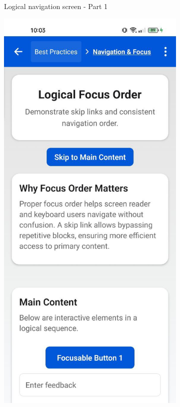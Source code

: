 \begin{enumerate}
\begin{itemize}
\begin{figure}[ht]
\begin{subfigure}[b]{0.48\textwidth}
                \caption{Logical navigation screen - Part 1}
                \label{fig:logical-left}
            \end{subfigure}
            \hfill
            \begin{subfigure}[b]{0.48\textwidth}
                \centering
                \includegraphics[width=\linewidth, alt={Second part of the Logical navigation screen}]{img/logical2.jpg}

\end{subfigure}
\end{figure}
\end{itemize}
\end{enumerate}
